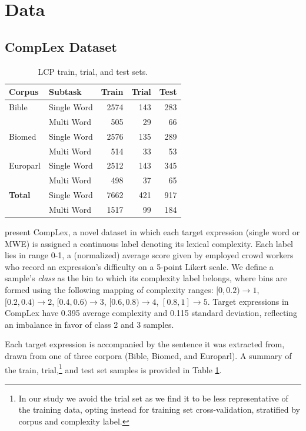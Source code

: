 \documentclass[11pt,a4paper]{article}
\begin{document}
\section{Data}

\subsection{CompLex Dataset}

\begin{table}
  \centering
  \begin{tabular}{l|l|r|r|r}
    \hline
    \centering
    \textbf{Corpus} & \textbf{Subtask} & \textbf{Train} &  \textbf{Trial} &  \textbf{Test} \\
    \hline
    Bible & Single Word &   2574 &    143 &   283 \\
            & Multi Word &    505 &     29 &    66 \\
    Biomed & Single Word &   2576 &    135 &   289 \\
            & Multi Word &    514 &     33 &    53 \\
    Europarl & Single Word &   2512 &    143 &   345 \\
            & Multi Word &    498 &     37 &    65 \\
    \hline
    \textbf{Total} & Single Word & 7662 & 421 & 917 \\
          & Multi Word &    1517 &     99 &    184 \\
    \hline
  \end{tabular}
  \caption{\label{tab:datasets} LCP train, trial, and test sets.}
\end{table}

\citet{shardlow2020complex} present CompLex, a novel dataset in which each target expression (single word or MWE) is assigned a continuous label denoting its lexical complexity. Each label lies in range 0-1, a (normalized) average score given by employed crowd workers who record an expression's difficulty on a 5-point Likert scale. We define a sample's \textit{class} as the bin to which its complexity label belongs, where bins are formed using the following mapping of complexity ranges: $[0,0.2) \rightarrow 1$, $[0.2, 0.4) \rightarrow 2$, $[0.4, 0.6) \rightarrow 3$, $[0.6, 0.8) \rightarrow 4$, $[0.8, 1] \rightarrow 5$. Target expressions in CompLex have 0.395 average complexity and 0.115 standard deviation, reflecting an imbalance in favor of class 2 and 3 samples. 

Each target expression is accompanied by the sentence it was extracted from, drawn from one of three corpora (Bible, Biomed, and Europarl). A summary of the train, trial,\footnote{In our study we avoid the trial set as we find it to be less representative of the training data, opting instead for training set cross-validation, stratified by corpus and complexity label.} and test set samples is provided in Table \ref{tab:datasets}.
\end{document}
